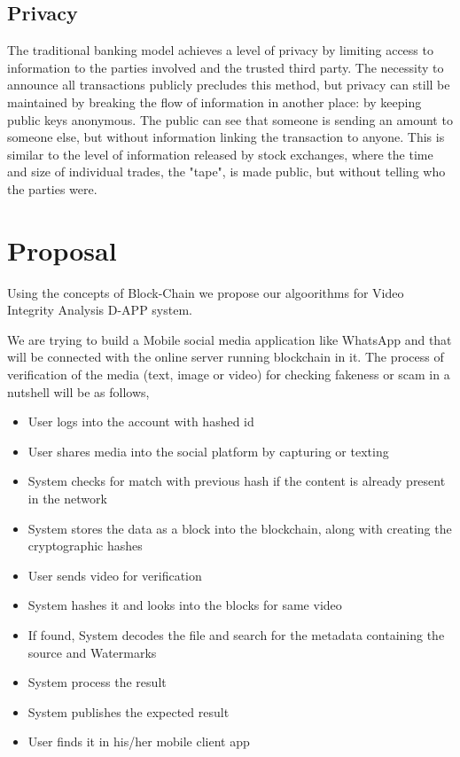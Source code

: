 \documentclass[a4paper,12pt]{report}
\begin{document}
\section{Privacy}
The traditional banking model achieves a level of privacy by limiting access to information to the
parties involved and the trusted third party. The necessity to announce all transactions publicly
precludes this method, but privacy can still be maintained by breaking the flow of information in
another place: by keeping public keys anonymous. The public can see that someone is sending
an amount to someone else, but without information linking the transaction to anyone. This is
similar to the level of information released by stock exchanges, where the time and size of
individual trades, the "tape", is made public, but without telling who the parties were.

\chapter{Proposal}
\label{Ch4} \setcounter{page}{1} 
\bigskip

Using the concepts of Block-Chain we propose our algoorithms for Video Integrity Analysis D-APP system.

We are trying to build a Mobile social media application like WhatsApp and that will be connected with the online server running blockchain in it. The process of verification of the media (text, image or video) for checking fakeness or scam in a nutshell will be as follows,

\begin{itemize}
\item User logs into the account with hashed id
\item User shares media into the social platform by capturing or texting
\item System checks for match with previous hash if the content is already present in the network
\item System stores the data as a block into the blockchain, along with creating the cryptographic hashes
\item User sends video for verification
\item System hashes it and looks into the blocks for same video
\item If found, System decodes the file and search for the metadata containing the source and Watermarks
\item System process the result
\item System publishes the expected result
\item User finds it in his/her mobile client app
\end{itemize}
\end{document}
